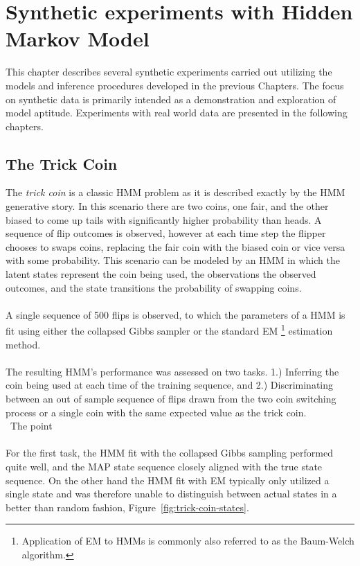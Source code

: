 \documentclass[12pt]{report}
\newcommand{\1}[0]{\mathbbm{1}}
\begin{document}
\chapter{Synthetic experiments with Hidden Markov Model}
\label{chap:Synthetic experiments with Hidden Markov Model}
This chapter describes several synthetic experiments carried out utilizing the models and
inference procedures developed in the previous Chapters. The focus on synthetic data
is primarily intended as a demonstration and exploration of model aptitude. Experiments
with real world data are presented in the following chapters.

\section{The Trick Coin}
The \emph{trick coin} is a classic \ac{HMM} problem as it is described exactly
by the \ac{HMM} generative story. In this scenario there are two coins, one fair,
and the other biased to come up tails with significantly higher probability than heads.
A sequence of flip outcomes is observed, however at each time step the flipper chooses
to swaps coins, replacing the fair coin with the biased coin or vice versa with some probability.
This scenario can be modeled by an \ac{HMM} in which the latent
states represent the coin being used, the observations the observed outcomes, and
the state transitions the probability of swapping coins.
\\\\
A single sequence of 500 flips is observed, to which the parameters of a \ac{HMM} is fit using
either the collapsed Gibbs sampler or the standard \ac{EM}
\footnote{Application of \ac{EM} to \acp{HMM} is commonly also referred to as
the Baum-Welch algorithm.}
estimation method.
\\\\
The resulting \ac{HMM}'s performance was assessed on two tasks. 1.) Inferring
the coin being used at each time of the training sequence, and 2.) Discriminating between an
out of sample sequence of flips drawn from the two coin switching process or a single coin with the
same expected value as the trick coin.
\\\
The point
\\\\
For the first task, the \ac{HMM} fit with the collapsed Gibbs sampling performed quite well,
and the \ac{MAP} state sequence closely aligned with the true state sequence.
On the other hand the \ac{HMM} fit with \ac{EM} typically only utilized a single state
and was therefore unable to distinguish between actual states in a better than random fashion,
Figure~\ref{fig:trick-coin-states}.
\end{document}
